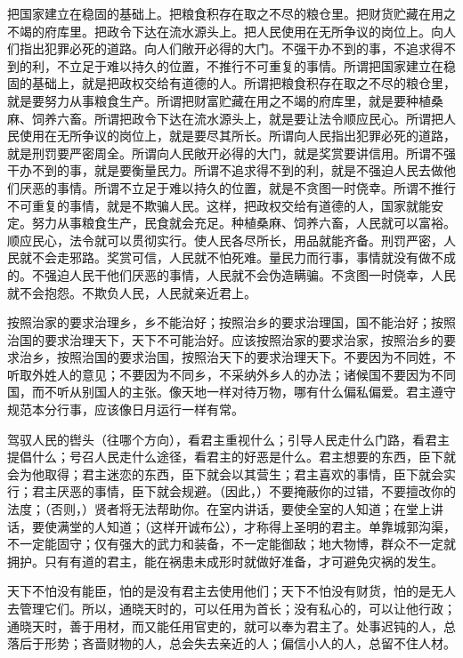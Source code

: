 \documentclass[12pt,UTF-8,openany,a4]{ctexbook}
\begin{document}
\begin{large}
    把国家建立在稳固的基础上。把粮食积存在取之不尽的粮仓里。把财货贮藏在用之不竭的府库里。把政令下达在流水源头上。把人民使用在无所争议的岗位上。向人们指出犯罪必死的道路。向人们敞开必得的大门。不强干办不到的事，不追求得不到的利，不立足于难以持久的位置，不推行不可重复的事情。所谓把国家建立在稳固的基础上，就是把政权交给有道德的人。所谓把粮食积存在取之不尽的粮仓里，就是要努力从事粮食生产。所谓把财富贮藏在用之不竭的府库里，就是要种植桑麻、饲养六畜。所谓把政令下达在流水源头上，就是要让法令顺应民心。所谓把人民使用在无所争议的岗位上，就是要尽其所长。所谓向人民指出犯罪必死的道路，就是刑罚要严密周全。所谓向人民敞开必得的大门，就是奖赏要讲信用。所谓不强干办不到的事，就是要衡量民力。所谓不追求得不到的利，就是不强迫人民去做他们厌恶的事情。所谓不立足于难以持久的位置，就是不贪图一时侥幸。所谓不推行不可重复的事情，就是不欺骗人民。这样，把政权交给有道德的人，国家就能安定。努力从事粮食生产，民食就会充足。种植桑麻、饲养六畜，人民就可以富裕。顺应民心，法令就可以贯彻实行。使人民各尽所长，用品就能齐备。刑罚严密，人民就不会走邪路。奖赏可信，人民就不怕死难。量民力而行事，事情就没有做不成的。不强迫人民干他们厌恶的事情，人民就不会伪造瞒骗。不贪图一时侥幸，人民就不会抱怨。不欺负人民，人民就亲近君上。
    
    按照治家的要求治理乡，乡不能治好；按照治乡的要求治理国，国不能治好；按照治国的要求治理天下，天下不可能治好。应该按照治家的要求治家，按照治乡的要求治乡，按照治国的要求治国，按照治天下的要求治理天下。不要因为不同姓，不听取外姓人的意见；不要因为不同乡，不采纳外乡人的办法；诸候国不要因为不同国，而不听从别国人的主张。像天地一样对待万物，哪有什么偏私偏爱。君主遵守规范本分行事，应该像日月运行一样有常。
    
    驾驭人民的辔头（往哪个方向），看君主重视什么；引导人民走什么门路，看君主提倡什么；号召人民走什么途径，看君主的好恶是什么。君主想要的东西，臣下就会为他取得；君主迷恋的东西，臣下就会以其营生；君主喜欢的事情，臣下就会实行；君主厌恶的事情，臣下就会规避。（因此，）不要掩蔽你的过错，不要擅改你的法度；（否则，）贤者将无法帮助你。在室内讲话，要使全室的人知道；在堂上讲话，要使满堂的人知道；（这样开诚布公），才称得上圣明的君主。单靠城郭沟渠，不一定能固守；仅有强大的武力和装备，不一定能御敌；地大物博，群众不一定就拥护。只有有道的君主，能在祸患未成形时就做好准备，才可避免灾祸的发生。
    
    天下不怕没有能臣，怕的是没有君主去使用他们；天下不怕没有财货，怕的是无人去管理它们。所以，通晓天时的，可以任用为首长；没有私心的，可以让他行政；通晓天时，善于用材，而又能任用官吏的，就可以奉为君主了。处事迟钝的人，总落后于形势；吝啬财物的人，总会失去亲近的人；偏信小人的人，总留不住人材。
    
\end{large}
\end{document}

